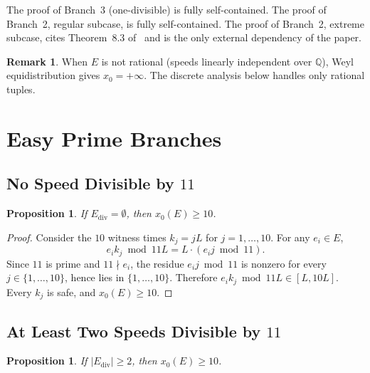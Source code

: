 \documentclass[11pt]{article}
\newtheorem{proposition}[theorem]{Proposition}
\theoremstyle{definition}
\newtheorem{remark}[theorem]{Remark}
\newcommand{\Ediv}{E_{\mathrm{div}}}
\begin{document}
The proof of Branch~3 (one-divisible) is fully self-contained.
The proof of Branch~2, regular subcase, is fully self-contained.
The proof of Branch~2, extreme subcase, cites Theorem~8.3 of~\cite{Pal26}
and is the only external dependency of the paper.

\begin{remark}
  When $E$ is not rational (speeds linearly independent over $\mathbb{Q}$),
  Weyl equidistribution gives $x_0 = +\infty$.
  The discrete analysis below handles only rational tuples.
\end{remark}

\section{Easy Prime Branches}

\subsection{No Speed Divisible by $11$}
\label{sec:nodiv}

\begin{proposition}
  \label{prop:nodiv}
  If $\Ediv = \emptyset$, then $x_0(E) \geq 10$.
\end{proposition}

\begin{proof}
  Consider the $10$ witness times $k_j = jL$ for $j = 1, \ldots, 10$.
  For any $e_i \in E$,
  \[
    e_i k_j \bmod 11L = L \cdot (e_i j \bmod 11).
  \]
  Since $11$ is prime and $11 \nmid e_i$, the residue $e_i j \bmod 11$ is
  nonzero for every $j \in \{1,\ldots,10\}$, hence lies in $\{1,\ldots,10\}$.
  Therefore $e_i k_j \bmod 11L \in [L, 10L]$.
  Every $k_j$ is safe, and $x_0(E) \geq 10$.
\end{proof}

\subsection{At Least Two Speeds Divisible by $11$}
\label{sec:multdiv}

\begin{proposition}
  \label{prop:multdiv}
  If $|\Ediv| \geq 2$, then $x_0(E) \geq 10$.
\end{proposition}
\end{document}

